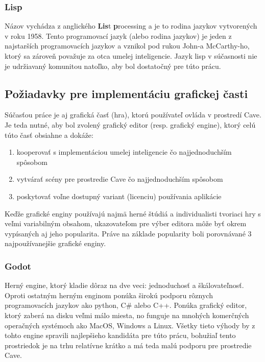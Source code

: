 \subsubsection{Lisp}

Názov vychádza z anglického \textbf{Lis}t \textbf{p}rocessing a je to rodina jazykov vytvorených v roku 1958.
Tento programovací jazyk (alebo rodina jazykov) je jeden z najstarších programovacích jazykov a vznikol pod rukou
John-a McCarthy-ho, ktorý sa zároveň považuje za otca umelej inteligencie.\cite{father_of_ai}
Jazyk lisp v súčasnosti nie je udržiavaný komunitou natoľko, aby bol dostatočný pre túto prácu.

\subsection{Požiadavky pre implementáciu grafickej časti}\label{subsec:requirements-game}

Súčasťou práce je aj grafická časť (hra), ktorú používateľ ovláda v prostredí Cave.
Je teda nutné, aby bol zvolený grafický editor (resp. grafický engine), ktorý celú túto časť obsiahne a dokáže:
\begin{enumerate}
    \item kooperovať s implementáciou umelej inteligencie čo najjednoduchším spôsobom
    \item vytvárať scény pre prostredie Cave čo najjednoduchším spôsobom
    \item poskytovať voľne dostupný variant (licenciu) používania aplikácie
\end{enumerate}
Keďže grafické enginy používajú najmä herné štúdiá a individualisti tvoriaci hry s veľmi variabilným obsahom,
ukazovateľom pre výber editora môže byť okrem vypísaných aj jeho popularita.
Práve na základe popularity\cite{best_3d_game_engines} boli porovnávané 3 najpoužívanejšie grafické enginy.

\subsubsection{Godot}
Herný engine, ktorý kladie dôraz na dve veci: jednoduchosť a škálovateľnosť.\cite{game_engine_godot}
Oproti ostatným herným enginom ponúka širokú podporu rôznych programovacích jazykov ako python, C\# alebo C++.
Ponúka grafický editor, ktorý zaberá na disku veľmi málo miesta, no funguje na mnohých komerčných operačných systémoch
ako MacOS, Windows a Linux.
Všetky tieto výhody by z tohto engine spravili najlepšieho kandidáta pre túto prácu, bohužiaľ tento prostriedok je na
trhu relatívne krátko a má teda malú podporu pre prostredie Cave.

